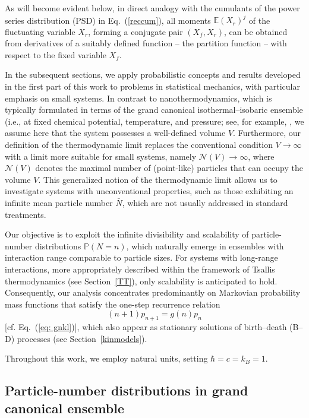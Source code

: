 \documentclass[a4paper,12pt]{amsart}
\theoremstyle{definition}
\theoremstyle{remark}
\begin{document}
As will become evident below, in direct analogy with the cumulants of the power series distribution (PSD) in Eq.~(\ref{reccum}), all moments \(\mathbb{E}(X_r)^j\) of the fluctuating variable \(X_r\), forming a conjugate pair \((X_f, X_r)\), can be obtained from derivatives of a suitably defined function -- the partition function --  with respect to the fixed variable \(X_f\).

In the subsequent sections, we apply probabilistic concepts and results developed in the first part of this work to problems in statistical mechanics, with particular emphasis on small systems. In contrast to nanothermodynamics, which is typically formulated in terms of the grand canonical isothermal–isobaric ensemble (i.e., at fixed chemical potential, temperature, and pressure; see, for example, \cite{chamberlin2020}, we assume here that the system possesses a well-defined volume \(V\). Furthermore, our definition of the thermodynamic limit replaces the conventional condition \(V \to \infty\) with a limit more suitable for small systems, namely \(\mathcal{N}(V) \to \infty\), where \(\mathcal{N}(V)\) denotes the maximal number of (point-like) particles that can occupy the volume \(V\). This generalized notion of the thermodynamic limit allows us to investigate systems with unconventional properties, such as those exhibiting an infinite mean particle number \(\bar{N}\), which are not usually addressed in standard treatments.

Our objective is to exploit the infinite divisibility and scalability of particle-number distributions \(\mathbb{P}(N = n)\), which naturally emerge in ensembles with interaction range comparable to particle sizes. For systems with long-range interactions, more appropriately described within the framework of Tsallis thermodynamics (see Section~\ref{TT}), only scalability is anticipated to hold. Consequently, our analysis concentrates predominantly on Markovian probability mass functions that satisfy the one-step recurrence relation
\[
(n+1)p_{n+1} = g(n)p_n
\]
[cf. Eq.~(\ref{eq: gnkl})], which also appear as stationary solutions of birth–death (B–D) processes (see Section~\ref{kinmodels}).

Throughout this work, we employ natural units, setting \(\hbar = c = k_B = 1\).%

\subsection{Particle-number distributions in grand canonical ensemble}
\end{document}

